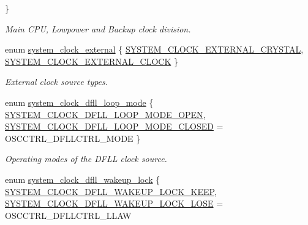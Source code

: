 \begin{DoxyCompactItemize}
 \}
\begin{DoxyCompactList}\small\item\em Main C\+P\+U, Lowpower and Backup clock division. \end{DoxyCompactList}\item 
enum \hyperlink{group__asfdoc__sam0__system__clock__group_gab463f9d80799466f12321e6252493e70}{system\+\_\+clock\+\_\+external} \{ \hyperlink{group__asfdoc__sam0__system__clock__group_ggab463f9d80799466f12321e6252493e70a1f1e123ed025f2e02f063d0d75b3ff56}{S\+Y\+S\+T\+E\+M\+\_\+\+C\+L\+O\+C\+K\+\_\+\+E\+X\+T\+E\+R\+N\+A\+L\+\_\+\+C\+R\+Y\+S\+T\+A\+L}, 
\hyperlink{group__asfdoc__sam0__system__clock__group_ggab463f9d80799466f12321e6252493e70a1521ad5b8607dd8bf7a6b5df1adee2f3}{S\+Y\+S\+T\+E\+M\+\_\+\+C\+L\+O\+C\+K\+\_\+\+E\+X\+T\+E\+R\+N\+A\+L\+\_\+\+C\+L\+O\+C\+K}
 \}
\begin{DoxyCompactList}\small\item\em External clock source types. \end{DoxyCompactList}\item 
enum \hyperlink{group__asfdoc__sam0__system__clock__group_gaf264d9ce05843104cb8a393b1d9ddfa2}{system\+\_\+clock\+\_\+dfll\+\_\+loop\+\_\+mode} \{ \hyperlink{group__asfdoc__sam0__system__clock__group_ggaf264d9ce05843104cb8a393b1d9ddfa2a3d9e15bfd0803e41da1f59f8b699184a}{S\+Y\+S\+T\+E\+M\+\_\+\+C\+L\+O\+C\+K\+\_\+\+D\+F\+L\+L\+\_\+\+L\+O\+O\+P\+\_\+\+M\+O\+D\+E\+\_\+\+O\+P\+E\+N}, 
\hyperlink{group__asfdoc__sam0__system__clock__group_ggaf264d9ce05843104cb8a393b1d9ddfa2a1a18e1d9233792ba5e4663c978d7a46b}{S\+Y\+S\+T\+E\+M\+\_\+\+C\+L\+O\+C\+K\+\_\+\+D\+F\+L\+L\+\_\+\+L\+O\+O\+P\+\_\+\+M\+O\+D\+E\+\_\+\+C\+L\+O\+S\+E\+D} = O\+S\+C\+C\+T\+R\+L\+\_\+\+D\+F\+L\+L\+C\+T\+R\+L\+\_\+\+M\+O\+D\+E
 \}
\begin{DoxyCompactList}\small\item\em Operating modes of the D\+F\+L\+L clock source. \end{DoxyCompactList}\item 
enum \hyperlink{group__asfdoc__sam0__system__clock__group_ga6ce68deec62f12bb85ddb2f8c103ada5}{system\+\_\+clock\+\_\+dfll\+\_\+wakeup\+\_\+lock} \{ \hyperlink{group__asfdoc__sam0__system__clock__group_gga6ce68deec62f12bb85ddb2f8c103ada5abbfd6c5e90f1ee8e9865723f6c1da64e}{S\+Y\+S\+T\+E\+M\+\_\+\+C\+L\+O\+C\+K\+\_\+\+D\+F\+L\+L\+\_\+\+W\+A\+K\+E\+U\+P\+\_\+\+L\+O\+C\+K\+\_\+\+K\+E\+E\+P}, 
\hyperlink{group__asfdoc__sam0__system__clock__group_gga6ce68deec62f12bb85ddb2f8c103ada5a291a819f86924e0d60fc5a2a14b5456c}{S\+Y\+S\+T\+E\+M\+\_\+\+C\+L\+O\+C\+K\+\_\+\+D\+F\+L\+L\+\_\+\+W\+A\+K\+E\+U\+P\+\_\+\+L\+O\+C\+K\+\_\+\+L\+O\+S\+E} = O\+S\+C\+C\+T\+R\+L\+\_\+\+D\+F\+L\+L\+C\+T\+R\+L\+\_\+\+L\+L\+A\+W

\end{DoxyCompactItemize}
